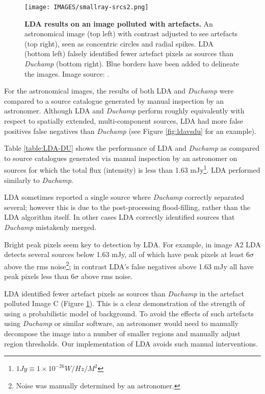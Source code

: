 \begin{figure}
\centering
\texttt{[image: IMAGES/smallray-srcs2.png]}
\caption[LDA results on an image polluted with artefacts]{\textbf{LDA results on an image polluted with artefacts.} An astronomical image (top left) with contrast adjusted to see artefacts (top right), seen as concentric circles and radial spikes. LDA (bottom left) falsely identified fewer artefact pixels as sources than \emph{Duchamp} (bottom right). Blue borders have been added to delineate the images.  Image source: \protect\cite{norris2006deep}.}
\label{fig:smallray}
\end{figure}

For the astronomical images, the results of both LDA and \emph{Duchamp} were compared to a source catalogue generated by manual inspection by an astronomer. Although LDA and \emph{Duchamp} perform roughly equivalently with respect to spatially extended, multi-component sources, LDA had more false positives false negatives than \emph{Duchamp} (see Figure \ref{fig:ldavsdu} for an example).

Table \ref{table:LDA-DU} shows the performance of LDA and \emph{Duchamp} as compared to source catalogues generated via manual inspection by an astronomer on sources for which the total flux (intensity) is less than 1.63 mJy\footnote{$1 Jy \equiv 1 \times 10^{-26} W/Hz/M^{2}$}. LDA performed similarly to \emph{Duchamp}. 

LDA sometimes reported a single source where \emph{Duchamp} correctly separated several; however this is due to the post-processing flood-filling, rather than the LDA algorithm itself. In other cases LDA correctly identified sources that \emph{Duchamp} mistakenly merged.

Bright peak pixels seem key to detection by LDA. For example, in image A2 LDA detects several sources below 1.63 mJy, all of which have peak pixels at least $6 \sigma$ above the rms noise\footnote{Noise was manually determined by an astronomer.}; in contrast LDA's false negatives above 1.63 mJy all have peak pixels less than $6 \sigma$ above rms noise.

LDA identified fewer artefact pixels as sources than \emph{Duchamp} in the artefact polluted Image C (Figure \ref{fig:smallray}). This is a clear demonstration of the strength of using a probabilistic model of background. To avoid the effects of such artefacts using \emph{Duchamp} or similar software, an astronomer would need to manually decompose the image into a number of smaller regions and manually adjust region thresholds. Our implementation of LDA avoids such manual interventions.

